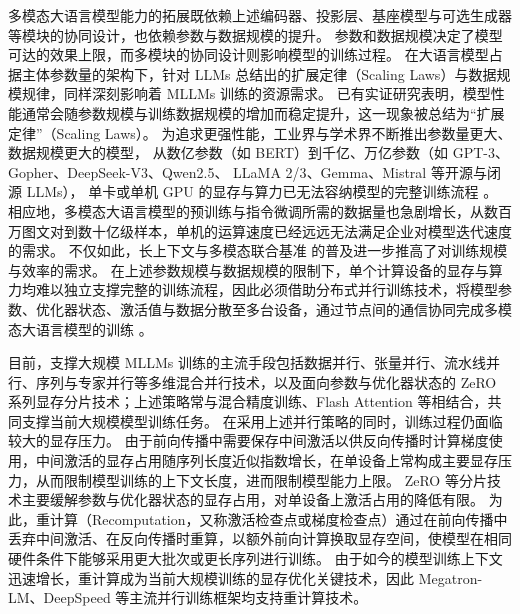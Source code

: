 多模态大语言模型能力的拓展既依赖上述编码器、投影层、基座模型与可选生成器等模块的协同设计，也依赖参数与数据规模的提升。
参数和数据规模决定了模型可达的效果上限，而多模块的协同设计则影响模型的训练过程。
在大语言模型占据主体参数量的架构下，针对 LLMs 总结出的扩展定律（Scaling Laws）与数据规模规律，同样深刻影响着 MLLMs 训练的资源需求。
已有实证研究表明，模型性能通常会随参数规模与训练数据规模的增加而稳定提升，这一现象被总结为“扩展定律”（Scaling Laws）\cite{kaplan2020scaling}。
为追求更强性能，工业界与学术界不断推出参数量更大、数据规模更大的模型，
从数亿参数（如 BERT）到千亿、万亿参数（如 GPT-3、Gopher\cite{gopher2022}、DeepSeek-V3\cite{deepseek2024}、Qwen2.5\cite{qwen2024}、
LLaMA 2/3\cite{llama2_2023,llama3}、Gemma\cite{gemma2024}、Mistral\cite{mistral2023} 等开源与闭源 LLMs），
单卡或单机 GPU 的显存与算力已无法容纳模型的完整训练流程%
\cite{megatron2021,megatron2020}。
相应地，多模态大语言模型的预训练与指令微调所需的数据量也急剧增长，从数百万图文对到数十亿级样本，单机的运算速度已经远远无法满足企业对模型迭代速度的需求。
不仅如此，长上下文与多模态联合基准\cite{long_context_benchmark2024} 的普及进一步推高了对训练规模与效率的需求。
在上述参数规模与数据规模的限制下，单个计算设备的显存与算力均难以独立支撑完整的训练流程，因此必须借助分布式并行训练技术，将模型参数、优化器状态、激活值与数据分散至多台设备，通过节点间的通信协同完成多模态大语言模型的训练%
\cite{zero2020,zero2021}。

目前，支撑大规模 MLLMs 训练的主流手段包括数据并行、张量并行、流水线并行、序列与专家并行等多维混合并行技术\cite{pytorch_ddp,megatron2020,megatron2021,gpipe,pipedream2019,gshard}，以及面向参数与优化器状态的 ZeRO 系列显存分片技术\cite{zero2020,zero2021}；上述策略常与混合精度训练\cite{mixed_precision2018}、Flash Attention\cite{flash_attention_2022,flashattention3_2024} 等相结合，共同支撑当前大规模模型训练任务。
在采用上述并行策略的同时，训练过程仍面临较大的显存压力。
由于前向传播中需要保存中间激活以供反向传播时计算梯度使用，中间激活的显存占用随序列长度近似指数增长，在单设备上常构成主要显存压力，从而限制模型训练的上下文长度，进而限制模型能力上限。
ZeRO 等分片技术主要缓解参数与优化器状态的显存占用，对单设备上激活占用的降低有限。
为此，重计算（Recomputation，又称激活检查点或梯度检查点）通过在前向传播中丢弃中间激活、在反向传播时重算，以额外前向计算换取显存空间，使模型在相同硬件条件下能够采用更大批次或更长序列进行训练\cite{chen2016checkpoint,megatron2023}。
由于如今的模型训练上下文迅速增长，重计算成为当前大规模训练的显存优化关键技术，因此 Megatron-LM、DeepSpeed 等主流并行训练框架均支持重计算技术。

